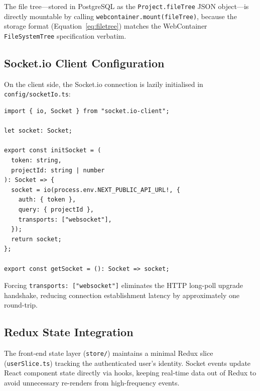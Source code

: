 The file tree—stored in PostgreSQL as the \texttt{Project.fileTree} JSON
object—is directly mountable by calling \texttt{webcontainer.mount(fileTree)},
because the storage format (Equation~\ref{eq:filetree}) matches the
WebContainer \texttt{FileSystemTree} specification verbatim.

\subsection{Socket.io Client Configuration}

On the client side, the Socket.io connection is lazily initialised in
\texttt{config/socketIo.ts}:

\begin{lstlisting}[caption={Socket.io client singleton
  (\texttt{config/socketIo.ts}).}, label=lst:socket_client]
import { io, Socket } from "socket.io-client";

let socket: Socket;

export const initSocket = (
  token: string,
  projectId: string | number
): Socket => {
  socket = io(process.env.NEXT_PUBLIC_API_URL!, {
    auth: { token },
    query: { projectId },
    transports: ["websocket"],
  });
  return socket;
};

export const getSocket = (): Socket => socket;
\end{lstlisting}

Forcing \texttt{transports: ["websocket"]} eliminates the HTTP long-poll
upgrade handshake, reducing connection establishment latency by approximately
one round-trip.

\subsection{Redux State Integration}

The front-end state layer (\texttt{store/}) maintains a minimal Redux slice
(\texttt{userSlice.ts}) tracking the authenticated user's identity. Socket
events update React component state directly via hooks, keeping real-time data
out of Redux to avoid unnecessary re-renders from high-frequency events.
